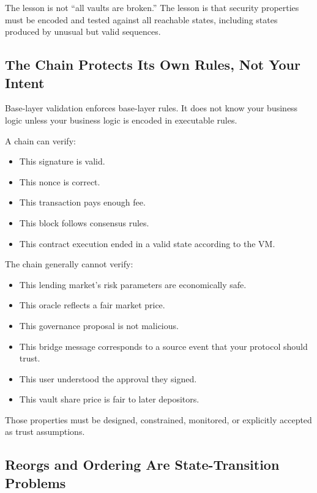 The lesson is not ``all vaults are broken.'' The lesson is that security
properties must be encoded and tested against all reachable states,
including states produced by unusual but valid sequences.

\subsection{The Chain Protects Its Own Rules, Not Your Intent}

Base-layer validation enforces base-layer rules. It does not know your
business logic unless your business logic is encoded in executable
rules.

A chain can verify:

\begin{itemize}
\tightlist
\item
  This signature is valid.
\item
  This nonce is correct.
\item
  This transaction pays enough fee.
\item
  This block follows consensus rules.
\item
  This contract execution ended in a valid state according to the VM.
\end{itemize}

The chain generally cannot verify:

\begin{itemize}
\tightlist
\item
  This lending market's risk parameters are economically safe.
\item
  This oracle reflects a fair market price.
\item
  This governance proposal is not malicious.
\item
  This bridge message corresponds to a source event that your protocol
  should trust.
\item
  This user understood the approval they signed.
\item
  This vault share price is fair to later depositors.
\end{itemize}

Those properties must be designed, constrained, monitored, or explicitly
accepted as trust assumptions.

\subsection{Reorgs and Ordering Are State-Transition Problems}

